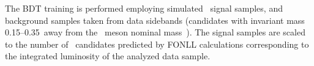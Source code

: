 %
The BDT training is performed employing simulated \PB\ signal samples, and background samples taken from data sidebands (candidates with invariant mass 0.15--0.35\GeVcc\ away from the \PB\ meson nominal mass~\cite{pdg2018}). %
The signal samples are scaled to the number of \PB\ candidates predicted by FONLL calculations corresponding to the integrated luminosity of the analyzed data sample.


%


